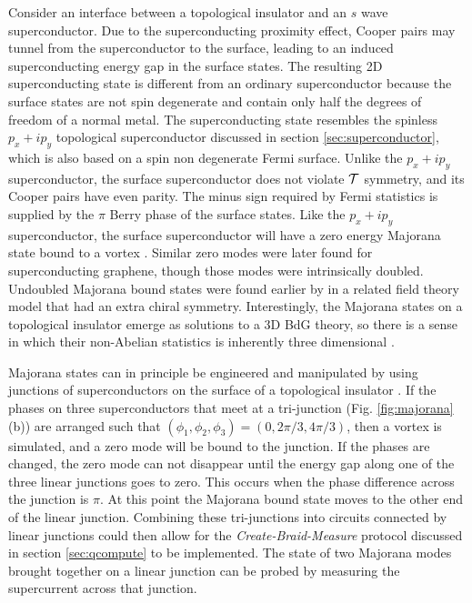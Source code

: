 \documentclass[twocolumn,floatfix,showpacs,rmp,aps]{revtex4}
\begin{document}
	Consider an interface between a topological insulator and an $s$ wave superconductor.
	Due to the superconducting proximity effect, Cooper pairs may tunnel from the
	superconductor to the surface, leading to
	an induced superconducting energy gap in the surface states.  The resulting
	2D superconducting state is different from an ordinary
	superconductor because the surface states are not spin degenerate and
	contain only half the degrees of freedom of a normal metal.  The
	superconducting state resembles the spinless $p_x+i p_y$ topological superconductor discussed in
	section \ref{sec:superconductor}, which is also based on a spin non degenerate Fermi
	surface.   Unlike the $p_x+i p_y$ superconductor, the surface superconductor does not
	violate ${\cal T}$ symmetry, and its Cooper pairs have even
	parity.  The minus sign required by Fermi statistics is supplied by the $\pi$
	Berry phase of the surface states.  Like the $p_x+ip_y$ superconductor,
	the surface superconductor will have a zero energy Majorana state
	bound to a vortex \cite{fukane08}.
	Similar zero modes were later found for superconducting
	graphene\cite{ghaemi07,bergman09}, though those modes were intrinsically doubled.
	Undoubled Majorana bound states were found earlier by \textcite{jackiw81}
	in a related field theory model that had an extra chiral symmetry.
	Interestingly, the Majorana states on a topological insulator
	emerge as solutions to a 3D BdG theory, so there is a sense in which their
	non-Abelian statistics is inherently three dimensional \cite{teokane10}.
	
	Majorana states can in principle be engineered and manipulated by using junctions of superconductors
	on the surface of a topological insulator \cite{fukane08}.   If the phases on three superconductors
	that meet at a tri-junction (Fig. \ref{fig:majorana}(b)) are arranged such that $(\phi_1,\phi_2,\phi_3) =
	(0,2\pi/3,4\pi/3)$, then a vortex is simulated, and a zero mode will
	be bound to the junction.  If the phases are changed, the zero mode
	can not disappear until the energy gap along one of the three linear
	junctions goes to zero.  This occurs when the phase difference across
	the junction is $\pi$.  At this point the Majorana bound state moves to the
	other end of the linear junction.  Combining these tri-junctions into
	circuits connected by linear junctions could then allow for
	the {\it Create-Braid-Measure} protocol discussed in section
	\ref{sec:qcompute} to be implemented.
	The state of two Majorana modes brought
	together on a linear junction can be probed by measuring the
	supercurrent across that junction.
	
\end{document}
